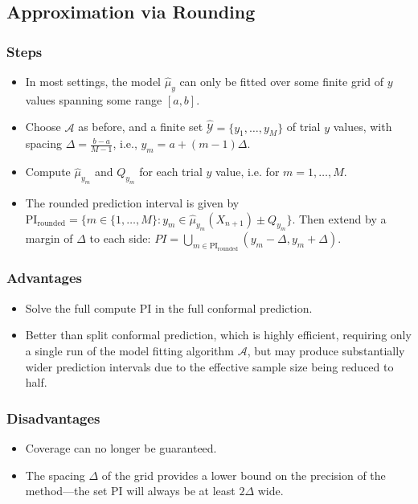 \documentclass[11pt,a4paper]{article}
\begin{document}
\subsection{Approximation via Rounding}
\subsubsection{Steps}
\begin{itemize}
    \item In most settings, the model $\hat{\mu}_y$ can only be fitted over some finite grid of $y$ values spanning some range $[a, b]$.
    \item Choose $\mathcal{A}$ as before, and a finite set $\hat{\mathcal{Y}} = \{y_1, \dots, y_M\}$ of trial $y$ values, with spacing $\Delta = \frac{b-a}{M-1}$, i.e., $y_m = a + (m-1)\Delta$.
    \item Compute $\hat{\mu}_{y_m}$ and $Q_{y_m}$ for each trial $y$ value, i.e. for $m = 1, \dots, M$.
    \item The rounded prediction interval is given by $\text{PI}_{\text{rounded}} = \{m \in \{1, \dots, M\} : y_m \in \hat{\mu}_{y_m}(X_{n+1}) \pm Q_{y_m}\}$. Then extend by a margin of $\Delta$ to each side: $PI = \bigcup_{m \in \text{PI}_{\text{rounded}}} (y_m - \Delta, y_m + \Delta)$.
\end{itemize}

\subsubsection{Advantages}
\begin{itemize}
    \item Solve the full compute PI in the full conformal prediction.
    \item Better than split conformal prediction, which is highly efficient, requiring only a single run of the model fitting algorithm $\mathcal{A}$, but may produce substantially wider prediction intervals due to the effective sample size being reduced to half.
\end{itemize}

\subsubsection{Disadvantages}
\begin{itemize}
    \item Coverage can no longer be guaranteed.
    \item The spacing $\Delta$ of the grid provides a lower bound on the precision of the method—the set PI will always be at least $2\Delta$ wide.
\end{itemize}
\end{document}
